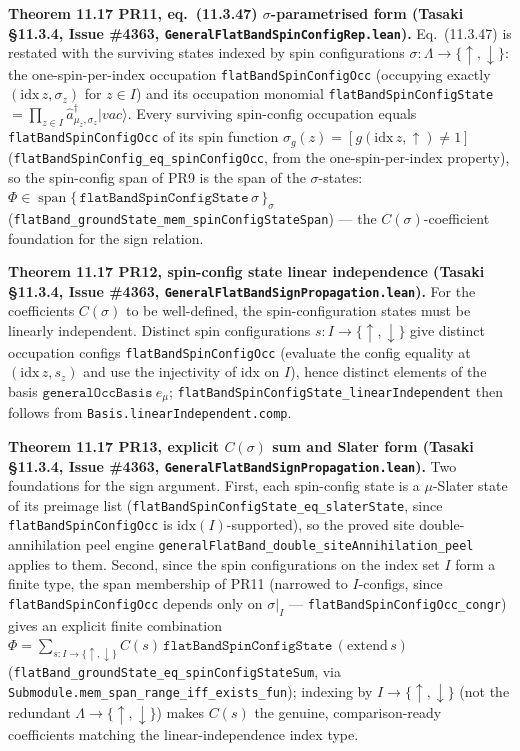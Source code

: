 \documentclass[a4paper,11pt]{article}
\begin{document}
\medskip\noindent\textbf{Theorem 11.17 PR11, eq.~(11.3.47) $\sigma$-parametrised form (Tasaki
§11.3.4, Issue \#4363, \texttt{GeneralFlatBandSpinConfigRep.lean}).}  Eq.~(11.3.47) is restated with
the surviving states indexed by spin configurations $\sigma:\Lambda\to\{\uparrow,\downarrow\}$: the
one-spin-per-index occupation \texttt{flatBandSpinConfigOcc} (occupying exactly $(\mathrm{idx}\,z,
\sigma_z)$ for $z\in I$) and its occupation monomial \texttt{flatBandSpinConfigState}
$=\prod_{z\in I}\hat a^\dagger_{\mu_z,\sigma_z}|vac\rangle$.  Every surviving spin-config occupation
equals \texttt{flatBandSpinConfigOcc} of its spin function $\sigma_g(z)=[g(\mathrm{idx}\,z,\uparrow)
\ne1]$ (\texttt{flatBandSpinConfig\_eq\_spinConfigOcc}, from the one-spin-per-index property), so the
spin-config span of PR9 is the span of the $\sigma$-states:
$\Phi\in\operatorname{span}\{\,\texttt{flatBandSpinConfigState}\,\sigma\,\}_\sigma$
(\texttt{flatBand\_groundState\_mem\_spinConfigStateSpan}) --- the $C(\sigma)$-coefficient foundation
for the sign relation.

\medskip\noindent\textbf{Theorem 11.17 PR12, spin-config state linear independence (Tasaki §11.3.4,
Issue \#4363, \texttt{GeneralFlatBandSignPropagation.lean}).}  For the coefficients $C(\sigma)$ to be
well-defined, the spin-configuration states must be linearly independent.  Distinct spin
configurations $s:I\to\{\uparrow,\downarrow\}$ give distinct occupation configs
\texttt{flatBandSpinConfigOcc} (evaluate the config equality at $(\mathrm{idx}\,z, s_z)$ and use the
injectivity of $\mathrm{idx}$ on $I$), hence distinct elements of the basis
$\texttt{generalOccBasis}\ e_\mu$; \texttt{flatBandSpinConfigState\_linearIndependent} then follows
from \texttt{Basis.linearIndependent.comp}.

\medskip\noindent\textbf{Theorem 11.17 PR13, explicit $C(\sigma)$ sum and Slater form (Tasaki
§11.3.4, Issue \#4363, \texttt{GeneralFlatBandSignPropagation.lean}).}  Two foundations for the
sign argument.  First, each spin-config state is a $\mu$-Slater state of its preimage list
(\texttt{flatBandSpinConfigState\_eq\_slaterState}, since \texttt{flatBandSpinConfigOcc} is
$\mathrm{idx}(I)$-supported), so the proved site double-annihilation peel engine
\texttt{generalFlatBand\_double\_siteAnnihilation\_peel} applies to them.  Second, since the spin
configurations on the index set $I$ form a finite type, the span membership of PR11 (narrowed to
$I$-configs, since \texttt{flatBandSpinConfigOcc} depends only on $\sigma|_I$ ---
\texttt{flatBandSpinConfigOcc\_congr}) gives an explicit finite combination
$\Phi=\sum_{s:I\to\{\uparrow,\downarrow\}} C(s)\,\texttt{flatBandSpinConfigState}\,(\mathrm{extend}\,s)$
(\texttt{flatBand\_groundState\_eq\_spinConfigStateSum}, via
\texttt{Submodule.mem\_span\_range\_iff\_exists\_fun}); indexing by $I\to\{\uparrow,\downarrow\}$
(not the redundant $\Lambda\to\{\uparrow,\downarrow\}$) makes $C(s)$ the genuine, comparison-ready
coefficients matching the linear-independence index type.
\end{document}
